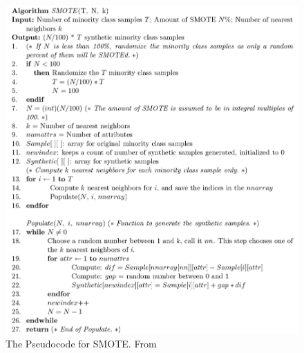 \documentclass[10pt, journal, compsoc]{IEEEtran}
\begin{document}
\begin{figure}[htbp!]
  \includegraphics[width=\linewidth]{SMOTE_pseudocode.jpg}
  \caption{The Pseudocode for SMOTE. From \cite{smote}}
\end{figure}
\end{document}
